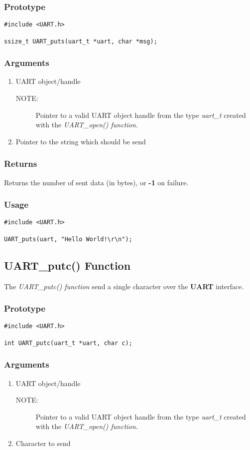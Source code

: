 \documentclass{report}
\begin{document}
\subsubsection*{Prototype}
\begin{lstlisting}
#include <UART.h>

ssize_t UART_puts(uart_t *uart, char *msg);
\end{lstlisting}
\subsubsection*{Arguments}
\begin{enumerate}
\item UART object/handle
\begin{description}
\item[NOTE:] Pointer to a valid UART object handle from the type \textit{uart\_t}
created with the \textit{UART\_open() function}.
\end{description}
\item Pointer to the string which should be send
\end{enumerate}
\subsubsection*{Returns}
Returns the number of sent data (in bytes), or \textbf{-1} on failure.
\subsubsection*{Usage}
\begin{lstlisting}
#include <UART.h>

UART_puts(uart, "Hello World!\r\n");
\end{lstlisting}
\subsection{UART\_putc() Function}
The \textit{UART\_putc() function} send a single character over
the \textbf{UART} interface.
\subsubsection*{Prototype}
\begin{lstlisting}
#include <UART.h>

int UART_putc(uart_t *uart, char c);
\end{lstlisting}
\subsubsection*{Arguments}
\begin{enumerate}
\item UART object/handle
\begin{description}
\item[NOTE:] Pointer to a valid UART object handle from the type \textit{uart\_t}
created with the \textit{UART\_open() function}.
\end{description}
\item Character to send
\end{enumerate}
\end{document}
